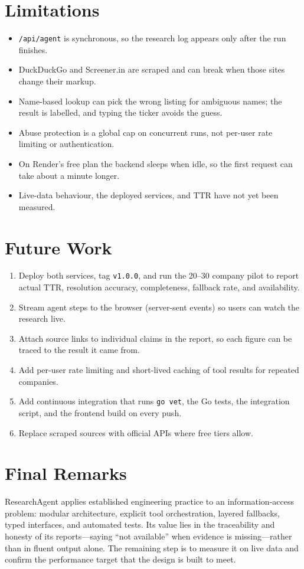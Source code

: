 \documentclass[12pt,a4paper,oneside]{report}
\begin{document}
\section{Limitations}
\begin{itemize}[leftmargin=*]
\item \texttt{/api/agent} is synchronous, so the research log appears only after the run finishes.
\item DuckDuckGo and Screener.in are scraped and can break when those sites change their markup.
\item Name-based lookup can pick the wrong listing for ambiguous names; the result is labelled, and typing the ticker avoids the guess.
\item Abuse protection is a global cap on concurrent runs, not per-user rate limiting or authentication.
\item On Render's free plan the backend sleeps when idle, so the first request can take about a minute longer.
\item Live-data behaviour, the deployed services, and TTR have not yet been measured.
\end{itemize}

\section{Future Work}
\begin{enumerate}[leftmargin=*]
\item Deploy both services, tag \texttt{v1.0.0}, and run the 20--30 company pilot to report actual TTR, resolution accuracy, completeness, fallback rate, and availability.
\item Stream agent steps to the browser (server-sent events) so users can watch the research live.
\item Attach source links to individual claims in the report, so each figure can be traced to the result it came from.
\item Add per-user rate limiting and short-lived caching of tool results for repeated companies.
\item Add continuous integration that runs \texttt{go vet}, the Go tests, the integration script, and the frontend build on every push.
\item Replace scraped sources with official APIs where free tiers allow.
\end{enumerate}

\section{Final Remarks}
ResearchAgent applies established engineering practice to an information-access problem: modular architecture, explicit tool orchestration, layered fallbacks, typed interfaces, and automated tests. Its value lies in the traceability and honesty of its reports---saying ``not available'' when evidence is missing---rather than in fluent output alone. The remaining step is to measure it on live data and confirm the performance target that the design is built to meet.
\end{document}
